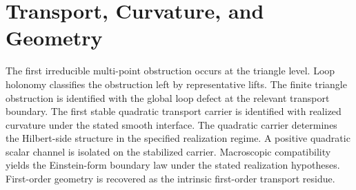 \section*{Transport, Curvature, and Geometry}
\begin{description}[leftmargin=4.8cm,style=nextline,itemsep=0.25em,before=\raggedright]
{The first irreducible multi-point obstruction occurs at the triangle
level.}
{Loop holonomy classifies the obstruction left by representative lifts.}
{The finite triangle obstruction is identified with the global loop
defect at the relevant transport boundary.}
{The first stable quadratic transport carrier is identified with realized
curvature under the stated smooth interface.}
{The quadratic carrier determines the Hilbert-side structure in the
specified realization regime.}
{A positive quadratic scalar channel is isolated on the stabilized
carrier.}
{Macroscopic compatibility yields the Einstein-form boundary law under
the stated realization hypotheses.}
{First-order geometry is recovered as the intrinsic first-order
transport residue.}
\end{description}

